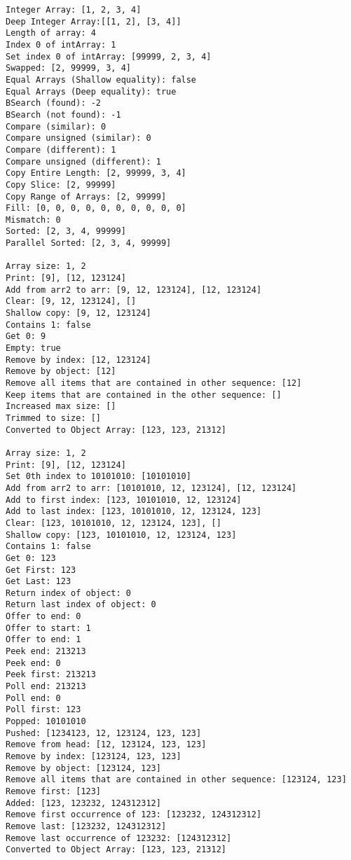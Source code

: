 \documentclass[9pt]{article}
\makeatletter
\newcommand{\boxspacing}{\kern\kvtcb@left@rule\kern\kvtcb@boxsep}
\newcommand{\prompt}[4]{
        {\ttfamily\llap{{\color{#2}[#3]:\hspace{3pt}#4}}\vspace{-\baselineskip}}
    }
\makeatother
\begin{document}
    \begin{Verbatim}[commandchars=\\\{\}]
Integer Array: [1, 2, 3, 4]
Deep Integer Array:[[1, 2], [3, 4]]
Length of array: 4
Index 0 of intArray: 1
Set index 0 of intArray: [99999, 2, 3, 4]
Swapped: [2, 99999, 3, 4]
Equal Arrays (Shallow equality): false
Equal Arrays (Deep equality): true
BSearch (found): -2
BSearch (not found): -1
Compare (similar): 0
Compare unsigned (similar): 0
Compare (different): 1
Compare unsigned (different): 1
Copy Entire Length: [2, 99999, 3, 4]
Copy Slice: [2, 99999]
Copy Range of Arrays: [2, 99999]
Fill: [0, 0, 0, 0, 0, 0, 0, 0, 0, 0]
Mismatch: 0
Sorted: [2, 3, 4, 99999]
Parallel Sorted: [2, 3, 4, 99999]

Array size: 1, 2
Print: [9], [12, 123124]
Add from arr2 to arr: [9, 12, 123124], [12, 123124]
Clear: [9, 12, 123124], []
Shallow copy: [9, 12, 123124]
Contains 1: false
Get 0: 9
Empty: true
Remove by index: [12, 123124]
Remove by object: [12]
Remove all items that are contained in other sequence: [12]
Keep items that are contained in the other sequence: []
Increased max size: []
Trimmed to size: []
Converted to Object Array: [123, 123, 21312]

Array size: 1, 2
Print: [9], [12, 123124]
Set 0th index to 10101010: [10101010]
Add from arr2 to arr: [10101010, 12, 123124], [12, 123124]
Add to first index: [123, 10101010, 12, 123124]
Add to last index: [123, 10101010, 12, 123124, 123]
Clear: [123, 10101010, 12, 123124, 123], []
Shallow copy: [123, 10101010, 12, 123124, 123]
Contains 1: false
Get 0: 123
Get First: 123
Get Last: 123
Return index of object: 0
Return last index of object: 0
Offer to end: 0
Offer to start: 1
Offer to end: 1
Peek end: 213213
Peek end: 0
Peek first: 213213
Poll end: 213213
Poll end: 0
Poll first: 123
Popped: 10101010
Pushed: [1234123, 12, 123124, 123, 123]
Remove from head: [12, 123124, 123, 123]
Remove by index: [123124, 123, 123]
Remove by object: [123124, 123]
Remove all items that are contained in other sequence: [123124, 123]
Remove first: [123]
Added: [123, 123232, 124312312]
Remove first occurrence of 123: [123232, 124312312]
Remove last: [123232, 124312312]
Remove last occurrence of 123232: [124312312]
Converted to Object Array: [123, 123, 21312]
    \end{Verbatim}

    \begin{tcolorbox}[breakable, size=fbox, boxrule=1pt, pad at break*=1mm,colback=cellbackground, colframe=cellborder]
\prompt{In}{incolor}{ }{\boxspacing}
\begin{Verbatim}[commandchars=\\\{\}]

\end{Verbatim}
\end{tcolorbox}


    
    
    
\end{document}
